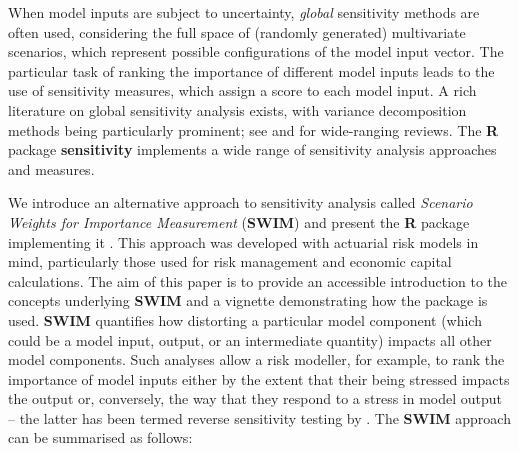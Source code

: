\documentclass[
]{article}
\begin{document}
When model inputs are subject to uncertainty, \emph{global} sensitivity methods are often used, considering the full space of (randomly generated) multivariate scenarios, which represent possible configurations of the model input vector. The particular task of ranking the importance of different model inputs leads to the use of sensitivity measures, which assign a score to each model input. A rich literature on global sensitivity analysis exists, with variance decomposition methods being particularly prominent; see \citet{Saltelli2008} and \citet{Borgonovo2016} for wide-ranging reviews. The \textbf{R} package \textbf{sensitivity} \citep{Rsensitivity} implements a wide range of sensitivity analysis approaches and measures.

We introduce an alternative approach to sensitivity analysis called \emph{Scenario Weights for Importance Measurement} (\textbf{SWIM}) and present the \textbf{R} package implementing it \citep{PesentiR}. This approach was developed with actuarial risk models in mind, particularly those used for risk management and economic capital calculations. The aim of this paper is to provide an accessible introduction to the concepts underlying \textbf{SWIM} and a vignette demonstrating how the package is used. \textbf{SWIM} quantifies how distorting a particular model component (which could be a model input, output, or an intermediate quantity) impacts all other model components. Such analyses allow a risk modeller, for example, to rank the importance of model inputs either by the extent that their being stressed impacts the output or, conversely, the way that they respond to a stress in model output -- the latter has been termed reverse sensitivity testing by \citet{Pesenti2019}. The \textbf{SWIM} approach can be summarised as follows:
\end{document}
